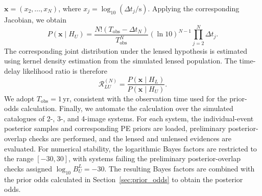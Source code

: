 \documentclass[pdflatex,sn-mathphys-num]{sn-jnl}%
\theoremstyle{thmstyleone}%
\theoremstyle{thmstyletwo}%
\theoremstyle{thmstylethree}%
\begin{document}
\(\boldsymbol{x}=(x_2,\ldots,x_N)\), where \(x_j=\log_{10}(\Delta t_j/\mathrm{s})\). Applying the 
corresponding Jacobian, we obtain
\[
P(\boldsymbol{x}\mid H_U) = \frac{N!(T_{\mathrm{obs}}-\Delta t_N)}{T_{\mathrm{obs}}^N}
(\ln 10)^{N-1}\prod_{j=2}^{N}\Delta t_j.
\]
The corresponding joint distribution under the lensed hypothesis is estimated using kernel density 
estimation from the simulated lensed population. The time-delay likelihood ratio is therefore
\[
\mathcal R_{LU}^{(N)} = \frac{P(\boldsymbol{x}\mid H_L)}{P(\boldsymbol{x}\mid H_U)}.
\]
We adopt \(T_{\mathrm{obs}}=1\,\mathrm{yr}\), consistent with the observation time used for the 
prior-odds calculation. 
Finally, we automate the calculation over the simulated catalogues of 2-, 3-, and 4-image systems. For 
each system, the individual-event posterior samples and corresponding PE priors are loaded, preliminary 
posterior-overlap checks are performed, and the lensed and unlensed evidences are evaluated. For 
numerical stability, the logarithmic Bayes factors are restricted to the range $[-30,30]$, with systems 
failing the preliminary posterior-overlap checks assigned $\log_{10} B_U^L = -30$. The resulting Bayes 
factors are combined with the prior odds calculated in Section~\ref{sec:prior_odds} to obtain the 
posterior odds.
\end{document}
